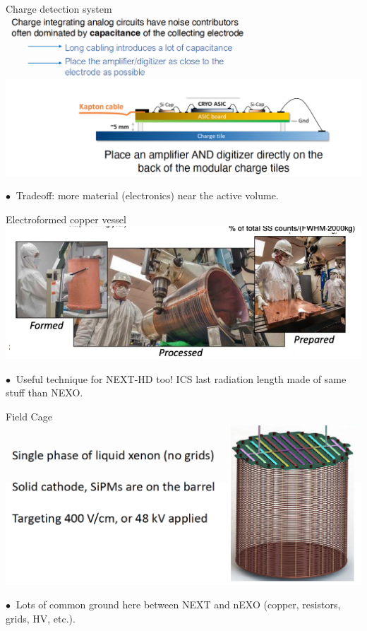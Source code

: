 \documentclass [aspectratio=169]{beamer}
\begin{document}

\begin{frame}{Charge detection system}
\includegraphics[scale=0.25]{chargeReadoutnexo.png}

$\bullet~$ Tradeoff: more material (electronics) near the active volume. 
\end{frame}

\begin{frame}{Electroformed copper vessel}
\includegraphics[scale=0.30]{electroformedcopper.png}

$\bullet~$ Useful technique for NEXT-HD too! ICS last radiation length made of same stuff than NEXO.  
\end{frame}

\begin{frame}{Field Cage}
\includegraphics[scale=0.30]{nexoFieldCage.png}

$\bullet~$ Lots of common ground here between NEXT and nEXO (copper, resistors, grids, HV, etc.).  
\end{frame}
\end{document}
